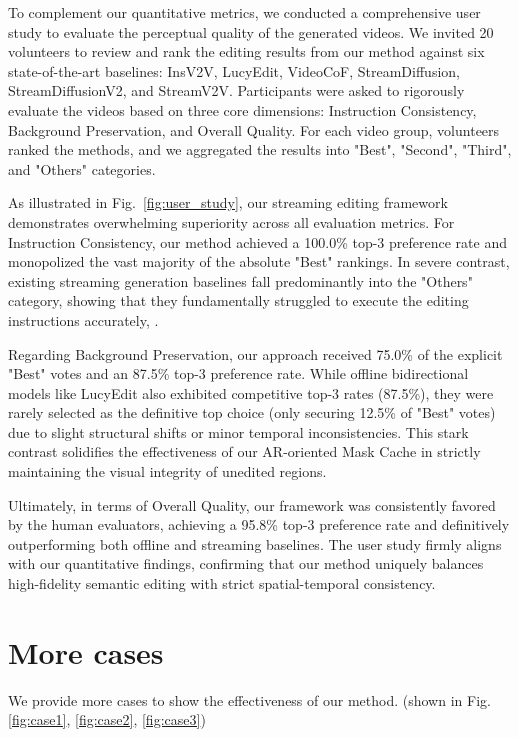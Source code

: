 \documentclass{llmxive}
\begin{document}
To complement our quantitative metrics, we conducted a comprehensive user study to evaluate the perceptual quality of the generated videos. We invited 20 volunteers to review and rank the editing results from our method against six state-of-the-art baselines: InsV2V, LucyEdit, VideoCoF, StreamDiffusion, StreamDiffusionV2, and StreamV2V. Participants were asked to rigorously evaluate the videos based on three core dimensions: Instruction Consistency, Background Preservation, and Overall Quality. For each video group, volunteers ranked the methods, and we aggregated the results into "Best", "Second", "Third", and "Others" categories.

As illustrated in Fig.~\ref{fig:user_study}, our streaming editing framework demonstrates overwhelming superiority across all evaluation metrics. For Instruction Consistency, our method achieved a 100.0\% top-3 preference rate and monopolized the vast majority of the absolute "Best" rankings. In severe contrast, existing streaming generation baselines fall predominantly into the "Others" category, showing that they fundamentally struggled to execute the editing instructions accurately, .

Regarding Background Preservation, our approach received 75.0\% of the explicit "Best" votes and an 87.5\% top-3 preference rate. While offline bidirectional models like LucyEdit also exhibited competitive top-3 rates (87.5\%), they were rarely selected as the definitive top choice (only securing 12.5\% of "Best" votes) due to slight structural shifts or minor temporal inconsistencies. This stark contrast solidifies the effectiveness of our AR-oriented Mask Cache in strictly maintaining the visual integrity of unedited regions.

Ultimately, in terms of Overall Quality, our framework was consistently favored by the human evaluators, achieving a 95.8\% top-3 preference rate and definitively outperforming both offline and streaming baselines. The user study firmly aligns with our quantitative findings, confirming that our method uniquely balances high-fidelity semantic editing with strict spatial-temporal consistency.

\section{More cases}

We provide more cases to show the effectiveness of our method. (shown in Fig. \ref{fig:case1}, \ref{fig:case2}, \ref{fig:case3})
\end{document}
